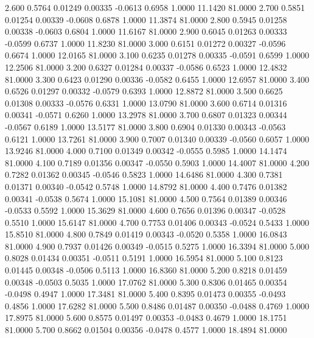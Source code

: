    2.600   0.5764   0.01249   0.00335  -0.0613   0.6958   1.0000  11.1420  81.0000
   2.700   0.5851   0.01254   0.00339  -0.0608   0.6878   1.0000  11.3874  81.0000
   2.800   0.5945   0.01258   0.00338  -0.0603   0.6804   1.0000  11.6167  81.0000
   2.900   0.6045   0.01263   0.00333  -0.0599   0.6737   1.0000  11.8230  81.0000
   3.000   0.6151   0.01272   0.00327  -0.0596   0.6674   1.0000  12.0165  81.0000
   3.100   0.6235   0.01278   0.00335  -0.0591   0.6599   1.0000  12.2506  81.0000
   3.200   0.6327   0.01284   0.00337  -0.0586   0.6523   1.0000  12.4832  81.0000
   3.300   0.6423   0.01290   0.00336  -0.0582   0.6455   1.0000  12.6957  81.0000
   3.400   0.6526   0.01297   0.00332  -0.0579   0.6393   1.0000  12.8872  81.0000
   3.500   0.6625   0.01308   0.00333  -0.0576   0.6331   1.0000  13.0790  81.0000
   3.600   0.6714   0.01316   0.00341  -0.0571   0.6260   1.0000  13.2978  81.0000
   3.700   0.6807   0.01323   0.00344  -0.0567   0.6189   1.0000  13.5177  81.0000
   3.800   0.6904   0.01330   0.00343  -0.0563   0.6121   1.0000  13.7261  81.0000
   3.900   0.7007   0.01340   0.00339  -0.0560   0.6057   1.0000  13.9246  81.0000
   4.000   0.7100   0.01349   0.00342  -0.0555   0.5985   1.0000  14.1474  81.0000
   4.100   0.7189   0.01356   0.00347  -0.0550   0.5903   1.0000  14.4007  81.0000
   4.200   0.7282   0.01362   0.00345  -0.0546   0.5823   1.0000  14.6486  81.0000
   4.300   0.7381   0.01371   0.00340  -0.0542   0.5748   1.0000  14.8792  81.0000
   4.400   0.7476   0.01382   0.00341  -0.0538   0.5674   1.0000  15.1081  81.0000
   4.500   0.7564   0.01389   0.00346  -0.0533   0.5592   1.0000  15.3629  81.0000
   4.600   0.7656   0.01396   0.00347  -0.0528   0.5510   1.0000  15.6147  81.0000
   4.700   0.7753   0.01406   0.00343  -0.0524   0.5433   1.0000  15.8510  81.0000
   4.800   0.7849   0.01419   0.00343  -0.0520   0.5358   1.0000  16.0843  81.0000
   4.900   0.7937   0.01426   0.00349  -0.0515   0.5275   1.0000  16.3394  81.0000
   5.000   0.8028   0.01434   0.00351  -0.0511   0.5191   1.0000  16.5954  81.0000
   5.100   0.8123   0.01445   0.00348  -0.0506   0.5113   1.0000  16.8360  81.0000
   5.200   0.8218   0.01459   0.00348  -0.0503   0.5035   1.0000  17.0762  81.0000
   5.300   0.8306   0.01465   0.00354  -0.0498   0.4947   1.0000  17.3481  81.0000
   5.400   0.8395   0.01473   0.00355  -0.0493   0.4856   1.0000  17.6282  81.0000
   5.500   0.8486   0.01487   0.00350  -0.0488   0.4769   1.0000  17.8975  81.0000
   5.600   0.8575   0.01497   0.00353  -0.0483   0.4679   1.0000  18.1751  81.0000
   5.700   0.8662   0.01504   0.00356  -0.0478   0.4577   1.0000  18.4894  81.0000
